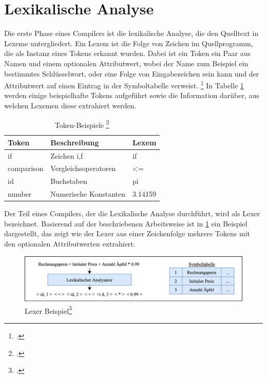 \section{Lexikalische Analyse}
Die erste Phase eines Compilers ist die lexikalische Analyse,  die den Quelltext in Lexeme untergliedert.  Ein Lexem ist die Folge von Zeichen im Quellprogramm,  die als Instanz eines Tokens erkannt wurden.  Dabei ist ein Token ein Paar aus Namen und einem optionalen Attributwert,  wobei der Name zum Beispiel ein bestimmtes Schlüsselwort, oder eine Folge von Eingabezeichen sein kann und der Attributwert auf einen Eintrag in der Symboltabelle verweist.  \footcite[Vgl.][S. 135 f.]{Ullmann2008} In Tabelle \ref{tab:Tokens} werden einige beispielhafte Tokens aufgeführt sowie die Information darüber, aus welchen Lexemen diese extrahiert werden.

\begin{table}[!ht]
\begin{tabularx}{\textwidth}{l|X|l}
   \textbf{Token} & \textbf{Beschreibung} & \textbf{Lexem} \\
\hline
if             & Zeichen i,f           & if                      \\ 
comparison     & Vergleichsoperatoren  & \textless{}=            \\ 
id             & Buchstaben            & pi                      \\ 
number         & Numerische Konstanten    & 3.14159                  
\end{tabularx}
\caption[Token-Beispiele]{Token-Beispiele \protect\footcite{Ullmann2008}}
 \label{tab:Tokens}
\end{table}

Der Teil eines Compilers,  der die Lexikalische Analyse durchführt,  wird als Lexer bezeichnet.  Basierend auf der beschriebenen Arbeitsweise ist in \ref{fig:LexerResult} ein Beispiel dargestellt, das zeigt wie der Lexer aus einer Zeichenfolge mehrere Tokens mit den optionalen Attributwerten extrahiert.  
 
\begin{figure}[!ht]
 \includegraphics[width=\textwidth,keepaspectratio]{Images/Compiler/LexerResult.png}
 \caption[Lexer Beispiel]{Lexer Beispiel\protect\footcite{Ullmann2008}}
 \label{fig:LexerResult}
\end{figure}

